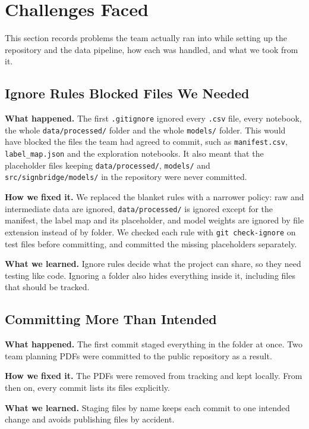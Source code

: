 \section{Challenges Faced}
\label{sec:challenges}

This section records problems the team actually ran into while setting up the repository and the data pipeline, how each was handled, and what we took from it.

\subsection{Ignore Rules Blocked Files We Needed}

\textbf{What happened.} The first \texttt{.gitignore} ignored every \texttt{.csv} file, every notebook, the whole \texttt{data/processed/} folder and the whole \texttt{models/} folder. This would have blocked the files the team had agreed to commit, such as \texttt{manifest.csv}, \texttt{label\_map.json} and the exploration notebooks. It also meant that the placeholder files keeping \texttt{data/processed/}, \texttt{models/} and \texttt{src/signbridge/models/} in the repository were never committed.

\textbf{How we fixed it.} We replaced the blanket rules with a narrower policy: raw and intermediate data are ignored, \texttt{data/processed/} is ignored except for the manifest, the label map and its placeholder, and model weights are ignored by file extension instead of by folder. We checked each rule with \texttt{git check-ignore} on test files before committing, and committed the missing placeholders separately.

\textbf{What we learned.} Ignore rules decide what the project can share, so they need testing like code. Ignoring a folder also hides everything inside it, including files that should be tracked.

\subsection{Committing More Than Intended}

\textbf{What happened.} The first commit staged everything in the folder at once. Two team planning PDFs were committed to the public repository as a result.

\textbf{How we fixed it.} The PDFs were removed from tracking and kept locally. From then on, every commit lists its files explicitly.

\textbf{What we learned.} Staging files by name keeps each commit to one intended change and avoids publishing files by accident.

